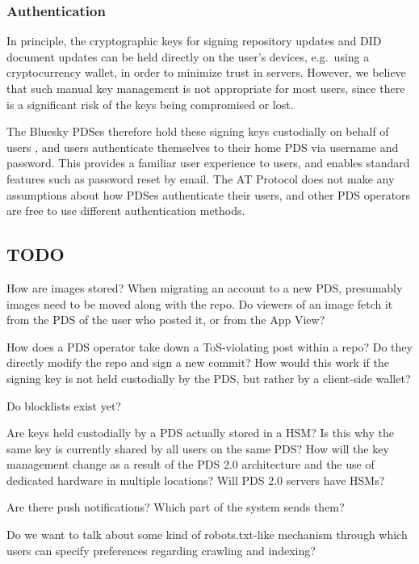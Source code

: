 \documentclass[sigconf,review]{acmart}
\begin{document}
\subsubsection{Authentication}

In principle, the cryptographic keys for signing repository updates and DID document updates can be held directly on the user's devices, e.g.\ using a cryptocurrency wallet, in order to minimize trust in servers.
However, we believe that such manual key management is not appropriate for most users, since there is a significant risk of the keys being compromised or lost.

The Bluesky PDSes therefore hold these signing keys custodially on behalf of users%
, and users authenticate themselves to their home PDS via username and password.
This provides a familiar user experience to users, and enables standard features such as password reset by email.
The AT Protocol does not make any assumptions about how PDSes authenticate their users, and other PDS operators are free to use different authentication methods.

\subsection{TODO}

How are images stored? When migrating an account to a new PDS, presumably images need to be moved along with the repo. Do viewers of an image fetch it from the PDS of the user who posted it, or from the App View?

How does a PDS operator take down a ToS-violating post within a repo? Do they directly modify the repo and sign a new commit? How would this work if the signing key is not held custodially by the PDS, but rather by a client-side wallet?

Do blocklists exist yet?

Are keys held custodially by a PDS actually stored in a HSM? Is this why the same key is currently shared by all users on the same PDS? How will the key management change as a result of the PDS 2.0 architecture and the use of dedicated hardware in multiple locations? Will PDS 2.0 servers have HSMs?

Are there push notifications? Which part of the system sends them?

Do we want to talk about some kind of robots.txt-like mechanism through which users can specify preferences regarding crawling and indexing?
\end{document}
